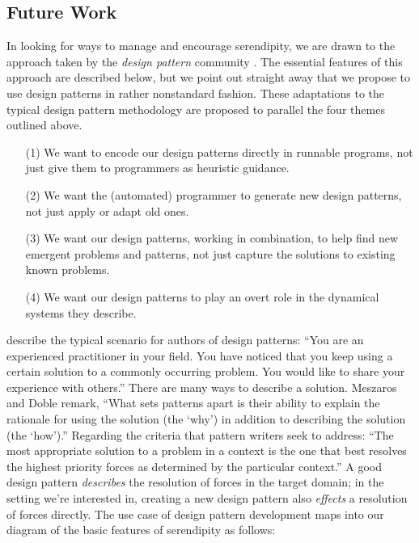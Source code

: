 \subsection{Future Work} \label{sec:futurework} \label{sec:hatching}

In looking for ways to manage and encourage serendipity, we are drawn
to the approach taken by the \emph{design pattern} community
\cite{alexander1999origins}.  The essential features of this approach
are described below, but we point out straight away that we propose to
use design patterns in rather nonstandard fashion.  These adaptations
to the typical design pattern methodology are proposed to parallel the
four themes outlined above.

\begin{itemize}
\item[(1)] We want to encode our design patterns directly in runnable
  programs, not just give them to programmers as heuristic guidance.
\item[(2)] We want the (automated) programmer to generate new design
  patterns, not just apply or adapt old ones.
\item[(3)] We want our design patterns, working in combination, to
  help find new emergent problems and patterns, not just capture the
  solutions to existing known problems.
\item[(4)] We want our design patterns to play an overt role in the
  dynamical systems they describe.
\end{itemize}

 describe the typical scenario for authors of design
patterns: ``You are an experienced practitioner in your
field. You have noticed that you keep using a certain solution to a
commonly occurring problem. You would like to share your experience
with others.''  There are many ways to describe a solution.
Meszaros and Doble remark, ``What sets patterns apart is their
ability to explain the rationale for using the solution (the `why') in
addition to describing the solution (the `how').''  Regarding the
criteria that pattern writers seek to address: ``The most appropriate
solution to a problem in a context is the one that best resolves the
highest priority forces as determined by the particular context.'' 
%
%
A good design pattern \emph{describes} the resolution of forces in the
target domain; in the setting we're interested in, creating a new
design pattern also \emph{effects} a resolution of forces directly.
The use case of design pattern development maps into our diagram of
the basic features of serendipity as follows:



